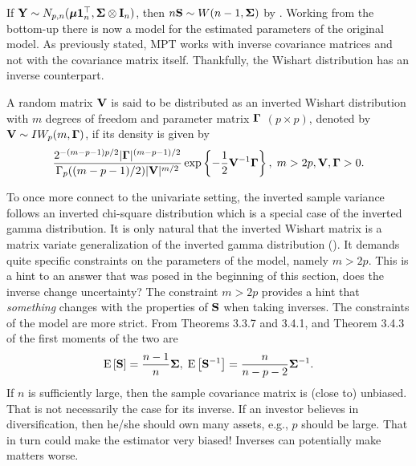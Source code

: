 \documentclass[12pt, oneside]{book}\usepackage{knitr}
\begin{document}
{If $\mathbf{Y} \sim N_{p,n}(\mbox{\boldmath$\mu$} \mathbf{1}_n^\top, \mathbf{\Sigma} \otimes \mathbf{I}_n)$, then $n\mathbf{S} \sim W(n-1, \mathbf{\Sigma})$ by \citet[Theorem 3.3.6]{GuptaNagar2000}.
Working from the bottom-up there is now a model for the estimated parameters of the original model.
As previously stated, MPT works with inverse covariance matrices and not with the covariance matrix itself. 
Thankfully, the Wishart distribution has an inverse counterpart.
\begin{definition}\label{def:inverse_wishart}
	A random matrix $\mathbf{V}$ is said to be distributed as an inverted Wishart distribution with $m$ degrees of freedom and parameter matrix $\boldsymbol{\Gamma}$ $(p \times p)$, denoted by $\mathbf{V} \sim IW_p(m, \boldsymbol{\Gamma})$, if its density is given by
	\begin{equation}\label{eqn:inverse_wishart}
	\frac{2^{-(m-p-1)p/2} |\boldsymbol{\Gamma}|^{(m-p-1)/2} }{\Gamma_p ((m-p-1)/2) |\mathbf{V}|^{m/2}} \exp\left\{ -\frac{1}{2} \mathbf{V}^{-1} \boldsymbol{\Gamma} \right\}, \; m > 2p, \mathbf{V}, \boldsymbol{\Gamma} > 0.
	\end{equation}
\end{definition}
To once more connect to the univariate setting, the inverted sample variance follows an inverted chi-square distribution which is a special case of the inverted gamma distribution.
It is only natural that the inverted Wishart matrix is a matrix variate generalization of the inverted gamma distribution (\citet[page 111]{GuptaNagar2000}). 
It demands quite specific constraints on the parameters of the model, namely $m > 2p$.
This is a hint to an answer that was posed in the beginning of this section, does the inverse change uncertainty? 
The constraint $m>2p$ provides a hint that \textit{something} changes with the properties of $\mathbf{S}$ when taking inverses.
The constraints of the model are more strict.
From Theorems 3.3.7 and 3.4.1, and Theorem 3.4.3 of \citet{GuptaNagar2000} the first moments of the two are
$$
\operatorname{E}\left[\mathbf{S}\right] = \frac{n-1}{n} \mathbf{\Sigma}, \; 
\operatorname{E}\left[\mathbf{S}^{-1}\right] = \frac{n}{n-p-2}\mathbf{\Sigma}^{-1}.
$$
If $n$ is sufficiently large, then the sample covariance matrix is (close to) unbiased.
That is not necessarily the case for its inverse.
If an investor believes in diversification, then he/she should own many assets, e.g., $p$ should be large.
That in turn could make the estimator very biased!
Inverses can potentially make matters worse.

}
\end{document}

